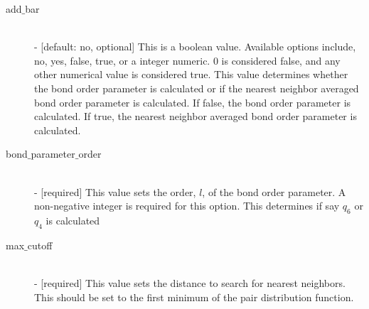 \documentclass{article}
\begin{document}
\begin{description}
	\item[add$\_$bar] \hfill \\
	- [default: no, optional] This is a boolean value.  Available options include, no, yes, false, true, or a integer numeric.  0 is considered false, and any other numerical value is considered true.  This value determines whether the bond order parameter is calculated or if the nearest neighbor averaged bond order parameter is calculated.  If false, the bond order parameter is calculated.  If true, the nearest neighbor averaged bond order parameter is calculated.
	
	\item[bond$\_$parameter$\_$order] \hfill \\
	- [required] This value sets the order, $l$, of the bond order parameter.  A non-negative integer is required for this option.  This determines if say $q_6$ or $q_4$ is calculated
	
	\item[max$\_$cutoff] \hfill \\
	- [required] This value sets the distance to search for nearest neighbors.  This should be set to the first minimum of the pair distribution function.	
	
\end{description}
\end{document}
